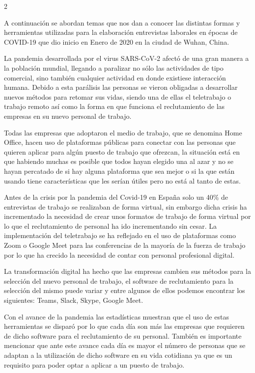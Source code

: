 \documentclass[12pt,spanish,Letterpaper,openany]{book}
\begin{document}
\begin {multicols}{2}

A continuación se abordan temas que nos dan a conocer las distintas formas y herramientas utilizadas para la elaboración entrevistas laborales en épocas de COVID-19 que dio inicio en Enero de 2020 en la ciudad de Wuhan, China.

La pandemia desarrollada por el virus SARS-CoV-2 afectó de una gran manera a la población mundial, llegando a paralizar no sólo las actividades de tipo comercial, sino también cualquier actividad en donde existiese interacción humana. Debido a esta parálisis las personas se vieron obligadas a desarrollar nuevos métodos para retomar sus vidas, siendo una de ellas el teletrabajo o trabajo remoto así como la forma en que funciona el reclutamiento de las empresas en su nuevo personal de trabajo.

Todas las empresas que adoptaron el medio de trabajo, que se denomina Home Office, hacen uso de plataformas públicas para conectar con las personas que quieren aplicar para algún puesto de trabajo que ofrezcan, la situación está en que habiendo muchas es posible que todos hayan elegido una al azar y no se hayan percatado de si hay alguna plataforma que sea mejor o si la que están usando tiene características que les serían útiles pero no está al tanto de estas.

Antes de la crisis por la pandemia del Covid-19 en España solo un 40\% de entrevistas de trabajo se realizaban de forma virtual, sin embargo dicha crisis ha incrementado la necesidad de crear unos formatos de trabajo de forma virtual por lo que el reclutamiento de personal ha ido incrementando sin cesar. La implementación del teletrabajo se ha reflejado en el uso de plataformas como Zoom o Google Meet para las conferencias de la mayoría de la fuerza de trabajo por lo que ha crecido la necesidad de contar con personal profesional digital.

La transformación digital ha hecho que las empresas cambien sus métodos para la selección del nuevo personal de trabajo, el software de reclutamiento para la selección del mismo puede variar y entre algunos de ellos podemos encontrar los siguientes: Teams, Slack, Skype, Google Meet.

Con el avance de la pandemia las estadísticas muestran que el uso de estas herramientas se disparó por lo que cada día son más las empresas que requieren de dicho software para el reclutamiento de su personal. También es importante mencionar que ante este avance cada día es mayor el número de personas que se adaptan a la utilización de dicho software en su vida cotidiana ya que es un requisito para poder optar a aplicar a un puesto de trabajo.


\end{multicols}
\end{document}
